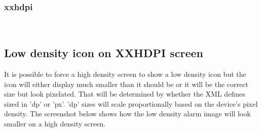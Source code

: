 \documentclass[11pt,english,numbers=endperiod,parskip=full]{scrartcl}
\begin{document}
{{\subsubsection{xxhdpi}
\\
\bigskip

\subsection{Low density icon on XXHDPI screen}
\raggedright
It is possible to force a high density screen to show a low density icon but the icon will either display much smaller than it should be or it will be the correct size but look pixelated. That will be determined by whether the XML defines sized in 'dp' or 'px'. 'dp' sizes will scale proportionally based on the device's pixel density. The screenshot below shows how the low density alarm image will look smaller on a high density screen. 

\\
\bigskip

}}
\end{document}
